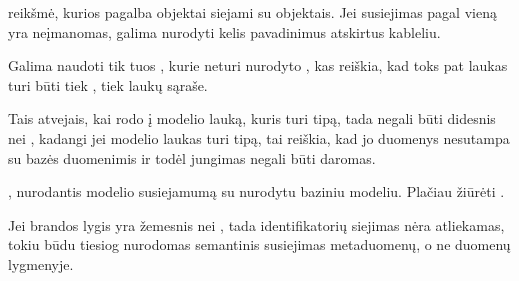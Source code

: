 \documentclass[letterpaper,10pt,lithuanian]{sphinxmanual}
\begin{document}
\begin{fulllineitems}
\label{\detokenize{dimensijos:base.ref}}
\pysigstartsignatures
\pysigline
{}
\pysigstopsignatures
\sphinxAtStartPar
{\hyperref[\detokenize{dimensijos:model.property}]{}} reikšmė, kurios pagalba {\hyperref[\detokenize{formatas:model}]{}} objektai
siejami su {\hyperref[\detokenize{formatas:base}]{}} objektais. Jei susiejimas pagal vieną {\hyperref[\detokenize{dimensijos:model.property}]{}}
yra neįmanomas, galima nurodyti kelis {\hyperref[\detokenize{dimensijos:model.property}]{}} pavadinimus
atskirtus kableliu.

\sphinxAtStartPar
Galima naudoti tik tuos {\hyperref[\detokenize{dimensijos:model.property}]{}}, kurie neturi nurodyto
{\hyperref[\detokenize{dimensijos:property.type}]{}}, kas reiškia, kad toks pat laukas turi būti tiek
{\hyperref[\detokenize{formatas:base}]{}}, tiek {\hyperref[\detokenize{formatas:model}]{}} laukų sąraše.

\sphinxAtStartPar
Tais atvejais, kai {\hyperref[\detokenize{dimensijos:base.ref}]{}} rodo į modelio lauką, kuris turi tipą,
tada {\hyperref[\detokenize{dimensijos:base.level}]{}} negali būti didesnis nei , kadangi jei modelio
laukas turi tipą, tai reiškia, kad jo duomenys nesutampa su bazės
duomenimis ir todėl jungimas negali būti daromas.

\end{fulllineitems}


\begin{fulllineitems}
\label{\detokenize{dimensijos:base.level}}
\pysigstartsignatures
\pysigline
{}
\pysigstopsignatures
\sphinxAtStartPar
{\hyperref[\detokenize{branda:level}]{}}, nurodantis modelio susiejamumą su nurodytu
baziniu modeliu. Plačiau žiūrėti {\hyperref[\detokenize{identifikatoriai:ref-level}]{}}.

\sphinxAtStartPar
Jei brandos lygis yra žemesnis nei , tada identifikatorių siejimas nėra
atliekamas, tokiu būdu tiesiog nurodomas semantinis susiejimas metaduomenų,
o ne duomenų lygmenyje.

\end{fulllineitems}
\end{document}

